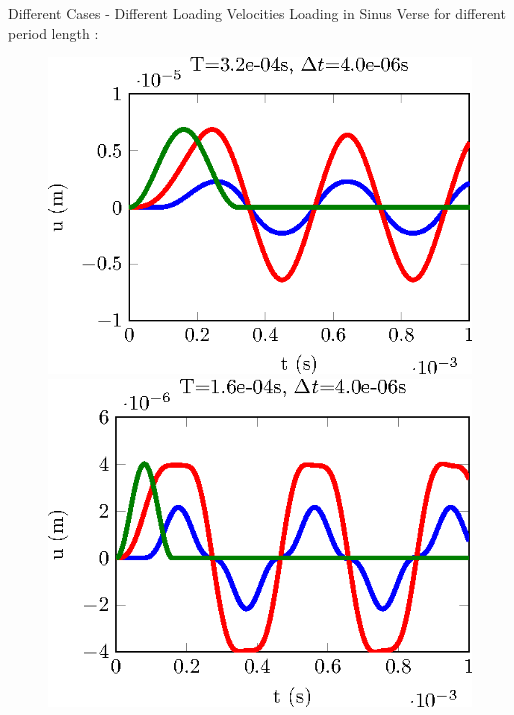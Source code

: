 \documentclass[10pt,a4paper]{beamer}
\begin{document}
\begin{frame}{Different Cases - Different Loading Velocities} 
	Loading in Sinus Verse for different period length :
	\begin{figure}
		\begin{minipage}{0.24\linewidth}
			\includegraphics[width=1\linewidth]{CalculSchem3.T4.tikz.eps}
		\end{minipage}
		\begin{minipage}{0.24\linewidth}
			\includegraphics[width=1\linewidth]{CalculSchem3.T3.tikz.eps}
		\end{minipage}
		\begin{minipage}{0.24\linewidth}

\end{minipage}
\end{figure}
\end{frame}
\end{document}
